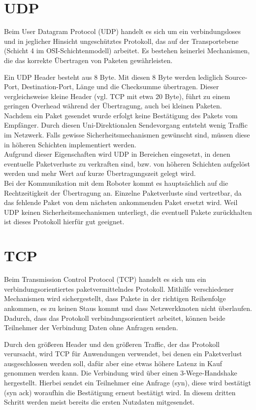 \section{UDP}
Beim User Datagram Protocol (UDP) handelt es sich um ein verbindungsloses und in jeglicher Hinsicht ungeschütztes Protokoll, das auf der Transportebene (Schicht 4 im OSI-Schichtenmodell) arbeitet. Es bestehen keinerlei Mechanismen, die das korrekte Übertragen von Paketen gewährleisten. 

Ein UDP Header besteht aus 8 Byte. Mit diesen 8 Byte werden lediglich Source-Port, Destination-Port, Länge und die Checksumme übertragen. Dieser vergleichsweise kleine Header (vgl. TCP mit etwa 20 Byte), führt zu einem geringen Overhead während der Übertragung, auch bei kleinen Paketen. Nachdem ein Paket gesendet wurde erfolgt keine Bestätigung des Pakets vom Empfänger. Durch diesen Uni-Direktionalen Sendevorgang entsteht wenig Traffic im Netzwerk. Falls gewisse Sicherheitsmechanismen gewünscht sind, müssen diese in höheren Schichten implementiert werden. \\
Aufgrund dieser Eigenschaften wird UDP in Bereichen eingesetzt, in denen eventuelle Paketverluste zu verkraften sind, bzw. von höheren Schichten aufgelöst werden und mehr Wert auf kurze Übertragungszeit gelegt wird.\\

Bei der Kommunikation mit dem Roboter kommt es hauptsächlich auf die Rechtzeitigkeit der Übertragung an. Einzelne Paketverluste sind vertretbar, da das fehlende Paket von dem nächsten ankommenden Paket ersetzt wird. Weil UDP keinen Sicherheitsmechanismen unterliegt, die eventuell Pakete zurückhalten ist dieses Protokoll hierfür gut geeignet.


\section{TCP}
Beim Transmission Control Protocol (TCP) handelt es sich um ein verbindungsorientiertes paketvermittelndes Protokoll. Mithilfe verschiedener Mechanismen wird sichergestellt, dass Pakete in der richtigen Reihenfolge ankommen, es zu keinen Staus kommt und dass Netzwerkknoten nicht überlaufen. Dadurch, dass das Protokoll verbindungsorientiert arbeitet, können beide Teilnehmer der Verbindung Daten ohne Anfragen senden. 

Durch den größeren Header und den größeren Traffic, der das Protokoll verursacht, wird TCP für Anwendungen verwendet, bei denen ein Paketverlust ausgeschlossen werden soll, dafür aber eine etwas höhere Latenz in Kauf genommen werden kann. 
Die Verbindung wird über einen 3-Wege-Handshake hergestellt. Hierbei sendet ein Teilnehmer eine Anfrage (syn), diese wird bestätigt (syn ack) woraufhin die Bestätigung erneut bestätigt wird. In diesem dritten Schritt werden meist bereits die ersten Nutzdaten mitgesendet.

